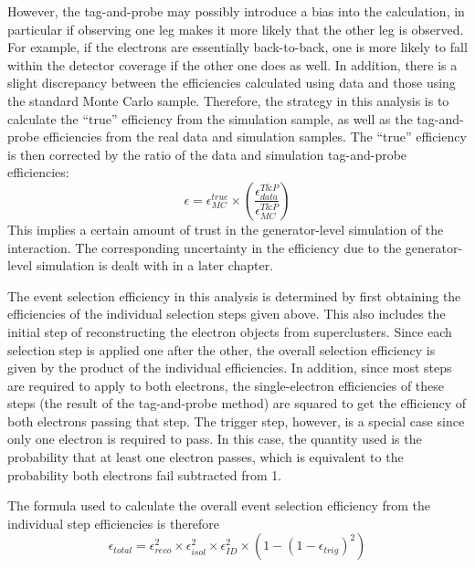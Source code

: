 However, the tag-and-probe may possibly introduce a bias 
into the calculation, 
in particular if observing one leg makes it more likely that 
the other leg is observed. 
For example, if the electrons are essentially back-to-back, 
one is more likely to fall within the detector coverage 
if the other one does as well.  
In addition, there is a slight discrepancy between the efficiencies 
calculated using data and those using the standard Monte Carlo sample.  
Therefore, the strategy in this analysis is to calculate the 
``true'' efficiency from the simulation sample, 
as well as the tag-and-probe efficiencies from the real data 
and simulation samples.  
The ``true'' efficiency is then corrected by the ratio of the 
data and simulation tag-and-probe efficiencies:
\[
\epsilon = \epsilon_{MC}^{true} \times \left( \frac{\epsilon_{data}^{T\&P}}{\epsilon_{MC}^{T\&P}} \right)
\]
This implies a certain amount of trust in the generator-level simulation of the interaction.  
The corresponding uncertainty in the efficiency due to the generator-level simulation 
is dealt with in a later chapter.  %

The event selection efficiency in this analysis is determined 
by first obtaining the efficiencies of the individual 
selection steps given above.%
This also includes the initial step of reconstructing 
the electron objects from superclusters.  
Since each selection step is applied one after the other, 
the overall selection efficiency is given by the product 
of the individual efficiencies.  
In addition, since most steps are required to apply to both electrons, 
the single-electron efficiencies of these steps 
(the result of the tag-and-probe method)
are squared to get 
the efficiency of both electrons passing that step.  
The trigger step, however, is a special case since only one electron is 
required to pass.  
In this case, the quantity used is the probability that at least 
one electron passes, 
which is equivalent to the probability both electrons fail 
subtracted from 1.  


The formula used to calculate the overall event selection efficiency 
from the individual step efficiencies is therefore 
\[
\epsilon_{total} = \epsilon_{reco}^2 \times \epsilon_{isol}^2 \times \epsilon_{ID}^2 \times \left( 1 - \left( 1 - \epsilon_{trig} \right)^2 \right)
\]


